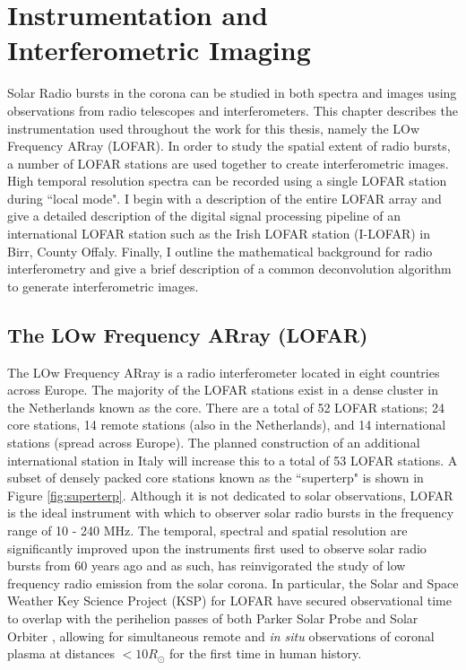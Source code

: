 \doublespacing
\chapter{Instrumentation and Interferometric Imaging}
\label{chap:instrumentation}
Solar Radio bursts in the corona can be studied in both spectra and images using observations from radio telescopes and interferometers. This chapter describes the instrumentation used throughout the work for this thesis, namely the LOw Frequency ARray (LOFAR). In order to study the spatial extent of radio bursts, a number of LOFAR stations are used together to create interferometric images.  High temporal resolution spectra can be recorded using a single LOFAR station during ``local mode". I begin with a description of the entire LOFAR array and give a detailed description of the digital signal processing pipeline of an international LOFAR station such as the Irish LOFAR station (I-LOFAR) in Birr, County Offaly. 
Finally, I outline the mathematical background for radio interferometry and give a brief description of a common deconvolution algorithm to generate interferometric images.

\section{The LOw Frequency ARray (LOFAR)}
The LOw Frequency ARray \citep[LOFAR;][]{VanHaarlem2013} is a radio interferometer located in eight countries across Europe. The majority of the LOFAR stations exist in a dense cluster in the Netherlands known as the core. There are a total of 52 LOFAR stations; 24 core stations, 14 remote stations (also in the Netherlands), and 14 international stations (spread across Europe). The planned construction of an additional international station in Italy will increase this to a total of 53 LOFAR stations. A subset of densely packed core stations known as the ``superterp" is shown in Figure \ref{fig:superterp}. Although it is not dedicated to solar observations, LOFAR is the ideal instrument with which to observer solar radio bursts in the frequency range of 10 - 240 MHz. The temporal, spectral and spatial resolution are significantly improved upon the instruments first used to observe solar radio bursts from 60 years ago and as such, has reinvigorated the study of low frequency radio emission from the solar corona. In particular, the Solar and Space Weather Key Science Project (KSP) for LOFAR have secured observational time to overlap with the perihelion passes of both Parker Solar Probe \citep[PSP;][]{Fox2016} and Solar Orbiter \citep{Muller2020}, allowing for simultaneous remote and \textit{in situ} observations of coronal plasma at distances $< 10 R_\odot$ for the first time in human history.

